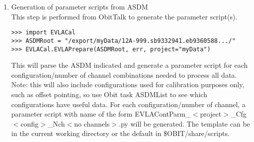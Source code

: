 \documentclass[11pt]{article}
\begin{document}
\begin{enumerate}
\item Generation of parameter scripts from ASDM\\
This step is performed from ObitTalk to generate the parameter
script(s).
\begin{verbatim}
>>> import EVLACal
>>> ASDMRoot = "/export/myData/12A-999.sb9332941.eb9360588.../"
>>> EVLACal.EVLAPrepare(ASDMRoot, err, project="myData")
\end{verbatim}
This will parse the ASDM indicated and generate a parameter script for
each configuration/number of channel combinations needed to process
all data.
Note: this will also include configurations used for calibration
purposes only, such as offset pointing, so use Obit task ASDMList to see
which configurations have useful data.
For each configuration/number of channel, a parameter script with name
of the form EVLAContParm\_$<$project$>$\_Cfg$<$config$>$\_Nch$<$no channels$>$.py
will be generated.
The template can be in the current working directory or the default
in \$OBIT/share/scripts.


\end{enumerate}
\end{document}
